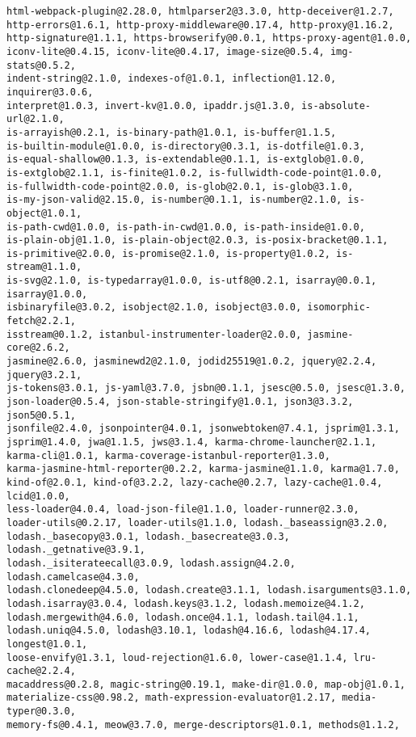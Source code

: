 \documentclass[a4paper]{article}
\begin{document}
\begin{verbatim}
html-webpack-plugin@2.28.0, htmlparser2@3.3.0, http-deceiver@1.2.7,
http-errors@1.6.1, http-proxy-middleware@0.17.4, http-proxy@1.16.2,
http-signature@1.1.1, https-browserify@0.0.1, https-proxy-agent@1.0.0,
iconv-lite@0.4.15, iconv-lite@0.4.17, image-size@0.5.4, img-stats@0.5.2,
indent-string@2.1.0, indexes-of@1.0.1, inflection@1.12.0, inquirer@3.0.6,
interpret@1.0.3, invert-kv@1.0.0, ipaddr.js@1.3.0, is-absolute-url@2.1.0,
is-arrayish@0.2.1, is-binary-path@1.0.1, is-buffer@1.1.5,
is-builtin-module@1.0.0, is-directory@0.3.1, is-dotfile@1.0.3,
is-equal-shallow@0.1.3, is-extendable@0.1.1, is-extglob@1.0.0,
is-extglob@2.1.1, is-finite@1.0.2, is-fullwidth-code-point@1.0.0,
is-fullwidth-code-point@2.0.0, is-glob@2.0.1, is-glob@3.1.0,
is-my-json-valid@2.15.0, is-number@0.1.1, is-number@2.1.0, is-object@1.0.1,
is-path-cwd@1.0.0, is-path-in-cwd@1.0.0, is-path-inside@1.0.0,
is-plain-obj@1.1.0, is-plain-object@2.0.3, is-posix-bracket@0.1.1,
is-primitive@2.0.0, is-promise@2.1.0, is-property@1.0.2, is-stream@1.1.0,
is-svg@2.1.0, is-typedarray@1.0.0, is-utf8@0.2.1, isarray@0.0.1, isarray@1.0.0,
isbinaryfile@3.0.2, isobject@2.1.0, isobject@3.0.0, isomorphic-fetch@2.2.1,
isstream@0.1.2, istanbul-instrumenter-loader@2.0.0, jasmine-core@2.6.2,
jasmine@2.6.0, jasminewd2@2.1.0, jodid25519@1.0.2, jquery@2.2.4, jquery@3.2.1,
js-tokens@3.0.1, js-yaml@3.7.0, jsbn@0.1.1, jsesc@0.5.0, jsesc@1.3.0,
json-loader@0.5.4, json-stable-stringify@1.0.1, json3@3.3.2, json5@0.5.1,
jsonfile@2.4.0, jsonpointer@4.0.1, jsonwebtoken@7.4.1, jsprim@1.3.1,
jsprim@1.4.0, jwa@1.1.5, jws@3.1.4, karma-chrome-launcher@2.1.1,
karma-cli@1.0.1, karma-coverage-istanbul-reporter@1.3.0,
karma-jasmine-html-reporter@0.2.2, karma-jasmine@1.1.0, karma@1.7.0,
kind-of@2.0.1, kind-of@3.2.2, lazy-cache@0.2.7, lazy-cache@1.0.4, lcid@1.0.0,
less-loader@4.0.4, load-json-file@1.1.0, loader-runner@2.3.0,
loader-utils@0.2.17, loader-utils@1.1.0, lodash._baseassign@3.2.0,
lodash._basecopy@3.0.1, lodash._basecreate@3.0.3, lodash._getnative@3.9.1,
lodash._isiterateecall@3.0.9, lodash.assign@4.2.0, lodash.camelcase@4.3.0,
lodash.clonedeep@4.5.0, lodash.create@3.1.1, lodash.isarguments@3.1.0,
lodash.isarray@3.0.4, lodash.keys@3.1.2, lodash.memoize@4.1.2,
lodash.mergewith@4.6.0, lodash.once@4.1.1, lodash.tail@4.1.1,
lodash.uniq@4.5.0, lodash@3.10.1, lodash@4.16.6, lodash@4.17.4, longest@1.0.1,
loose-envify@1.3.1, loud-rejection@1.6.0, lower-case@1.1.4, lru-cache@2.2.4,
macaddress@0.2.8, magic-string@0.19.1, make-dir@1.0.0, map-obj@1.0.1,
materialize-css@0.98.2, math-expression-evaluator@1.2.17, media-typer@0.3.0,
memory-fs@0.4.1, meow@3.7.0, merge-descriptors@1.0.1, methods@1.1.2,

\end{verbatim}
\end{document}
